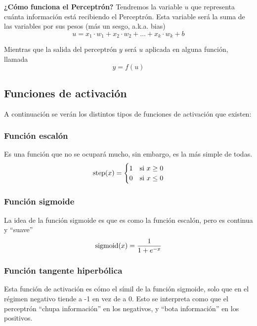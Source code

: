 \textbf{¿Cómo funciona el Perceptrón?} Tendremos la variable $u$ que representa cuánta información está recibiendo el Perceptrón. Esta variable será la suma de las variables por sus pesos (más un sesgo, a.k.a. bias)
\begin{equation}
    u = x_1 \cdot w_1 + x_2 \cdot w_2 + \ldots + x_k \cdot w_k + b
\end{equation}

Mientras que la salida del perceptrón $y$ será $u$ aplicada en alguna función, llamada 
\begin{equation}
    y = f(u)
\end{equation}

\subsection{Funciones de activación}

A continuación se verán los distintos tipos de funciones de activación que existen:

\subsubsection*{Función escalón}
Es una función que no se ocupará mucho, sin embargo, es la más simple de todas. 
\begin{equation}
    \operatorname{step}(x)=
    \begin{cases}
    1 & \mbox{si } x\geq 0\\
    0 & \mbox{si } x\leq 0
    \end{cases}
\end{equation}


\subsubsection*{Función sigmoide}
La idea de la función sigmoide es que es como la función escalón, pero es continua y ``suave''
\begin{equation}
    \operatorname{sigmoid}(x) = \frac{1}{1 + e^{-x}}
\end{equation}


\subsubsection*{Función tangente hiperbólica}
Esta función de activación es cómo el símil de la función sigmoide, solo que en el régimen negativo tiende a -1 en vez de a 0. Esto se interpreta como que el perceptrón ``chupa información'' en los negativos, y ``bota información'' en los positivos.

